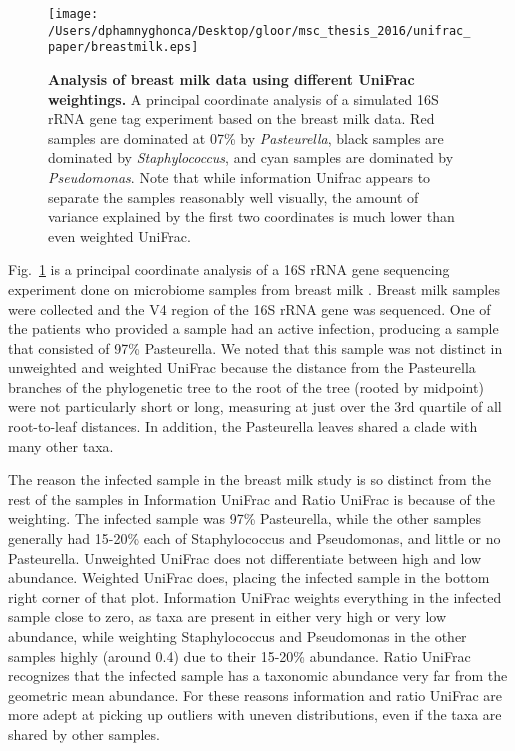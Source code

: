 \documentclass[10pt,letterpaper]{article}
\begin{document}
\begin{figure}[h]
\texttt{[image: /Users/dphamnyghonca/Desktop/gloor/msc\_thesis\_2016/unifrac\_paper/breastmilk.eps]}
\caption[Analysis of breast milk data using different UniFrac weightings.]{{\bf Analysis of breast milk data using different UniFrac weightings. }
A principal coordinate analysis of a simulated 16S rRNA gene tag experiment based on the breast milk data. Red samples are dominated at 07\% by \textit{Pasteurella}, black samples are dominated by \textit{Staphylococcus}, and cyan samples are dominated by \textit{Pseudomonas}. Note that while information Unifrac appears to separate the samples reasonably well visually, the amount of variance explained by the first two coordinates is much lower than even weighted UniFrac.}
\label{fig7}
\end{figure}

Fig.~\ref{fig7} is a principal coordinate analysis of a 16S rRNA gene sequencing experiment done on microbiome samples from breast milk \cite{urbaniak2016human}. Breast milk samples were collected and the V4 region of the 16S rRNA gene was sequenced. One of the patients who provided a sample had an active infection, producing a sample that consisted of 97\% Pasteurella. We noted that this sample was not distinct in unweighted and weighted UniFrac because the distance from the Pasteurella branches of the phylogenetic tree to the root of the tree (rooted by midpoint) were not particularly short or long, measuring at just over the 3rd quartile of all root-to-leaf distances. In addition, the Pasteurella leaves shared a clade with many other taxa.

The reason the infected sample in the breast milk study is so distinct from the rest of the samples in Information UniFrac and Ratio UniFrac is because of the weighting. The infected sample was 97\% Pasteurella, while the other samples generally had 15-20\% each of Staphylococcus and Pseudomonas, and little or no Pasteurella. Unweighted UniFrac does not differentiate between high and low abundance. Weighted UniFrac does, placing the infected sample in the bottom right corner of that plot. Information UniFrac weights everything in the infected sample close to zero, as taxa are present in either very high or very low abundance, while weighting Staphylococcus and Pseudomonas in the other samples highly (around 0.4) due to their 15-20\% abundance. Ratio UniFrac recognizes that the infected sample has a taxonomic abundance very far from the geometric mean abundance. For these reasons information and ratio UniFrac are more adept at picking up outliers with uneven distributions, even if the taxa are shared by other samples.
\end{document}
